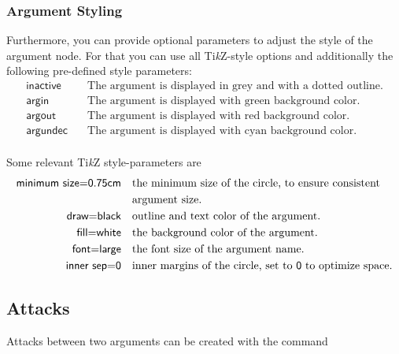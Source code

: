\documentclass{article}
\newcommand{\tikzname}{Ti\emph{k}Z\xspace}
\begin{document}
\subsubsection{Argument Styling}
    Furthermore, you can provide optional parameters to adjust the style of the argument node.
    For that you can use all \tikzname-style options and additionally the following pre-defined style parameters:
    \begin{align*}
        \mathsf{inactive} &\quad \text{The argument is displayed in grey and with a dotted outline.}\\
        \mathsf{argin} &\quad \text{The argument is displayed with green background color.}\\
        \mathsf{argout} &\quad \text{The argument is displayed with red background color.}\\
        \mathsf{argundec} &\quad \text{The argument is displayed with cyan background color.}\\
    \end{align*}

    Some relevant \tikzname style-parameters are
    \begin{align*}
        \textsf{minimum~size=0.75cm} &\quad \text{the minimum size of the circle, to ensure consistent}\\
        &\quad \text{argument size.}\\
        \textsf{draw=black} &\quad \text{outline and text color of the argument.}\\
        \textsf{fill=white} &\quad \text{the background color of the argument.}\\
        \textsf{font=large} &\quad \text{the font size of the argument name.}\\
        \textsf{inner~sep=0} &\quad \text{inner margins of the circle, set to \textsf{0} to optimize space.}
    \end{align*}
    

\subsection{Attacks}
    Attacks between two arguments can be created with the command\\
\end{document}
